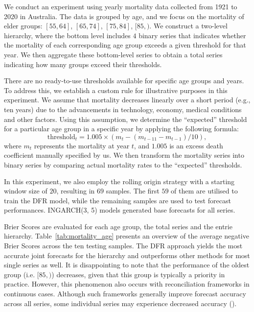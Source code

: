 \documentclass[a4paper,review,12pt,authoryear]{elsarticle}
\begin{document}
     We conduct an experiment using yearly mortality data collected from 1921 to 2020 in Australia.
     The data is grouped by age, and we focus on the mortality of elder groups: $[55, 64]$, $[65, 74]$, $[75, 84]$, $[85, )$. 
     We construct a two-level hierarchy, where the bottom level includes 
     $4$ binary series that indicates whether the mortality of each corresponding age group exceeds a given threshold for that year.
     We then aggregate these bottom-level series to obtain a total series indicating how many groups exceed their thresholds.
     
     There are no ready-to-use thresholds available for specific age groups and years. 
     To address this, we establish a custom rule for illustrative purposes in this experiment. 
     We assume that mortality decreases linearly over a short period (e.g., ten years) due to the advancements in technology, economy, medical conditions and other factors. 
     Using this assumption, we determine the ``expected'' threshold for a particular age group in a specific year by applying the following formula:
     \[
       \text{threshold}_t = 1.005 \times (m_t - (m_{t-11} - m_{t-1})/10),
     \]
     where $m_t$ represents the mortality at year $t$, and $1.005$ is an excess death coefficient manually specified by us.
     We then transform the mortality series into binary series by comparing actual mortality rates to the ``expected'' thresholds.
     
     In this experiment, we also employ the rolling origin strategy with a starting window size of $20$, resulting in $69$ samples.
     The first $59$ of them are utilised to train the DFR model, while the remaining samples are used to test forecast performances.
     INGARCH(3, 5) models generated base forecasts for all series. 
     
     Brier Scores are evaluated for each age group, the total series and the entrie hierarchy.
     Table~\ref{tab:mortality_age} presents an overview of the average negative Brier Scores across the ten testing samples.
     The DFR approach yields the most accurate joint forecasts for the hierarchy and outperforms other methods for most single series as well.
     It is disappointing to note that the performance of the oldest group (i.e. $[85, )$) decreases, given that this group is typically a priority in practice.
     However, this phenomenon also occurs with reconciliation frameworks in continuous cases. 
     Although such frameworks generally improve forecast accuracy across all series, some individual series may experience decreased accuracy (\citealp{zhangOptimalReconciliationImmutable2022a}).
     
\end{document}
